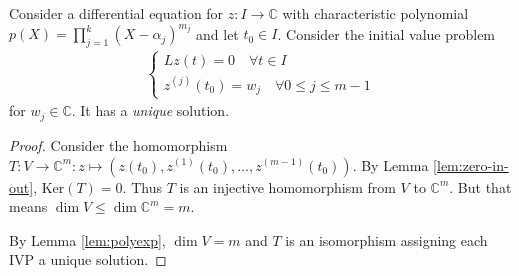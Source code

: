 \begin{prop}\label{prop:init-val-prob}
    Consider a differential equation for $z: I \to \mathbb{C}$ with characteristic polynomial $p(X) = \prod_{j=1}^{k}(X-\alpha_{j})^{m_{j}}$ and let $t_{0} \in I$. Consider the initial value problem 
    \begin{align*}
        \begin{cases}
            Lz(t) = 0 \quad \forall t \in I \\ 
            z^{(j)}(t_{0}) = w_{j} \quad \forall 0 \leq j \leq m-1
        \end{cases}
    \end{align*}
    for $w_{j} \in \mathbb{C}$. It has a \textit{unique} solution.
\end{prop}
\begin{proof}
    Consider the homomorphism $T: V \to \mathbb{C}^{m}: z \mapsto (z(t_{0}), z^{(1)}(t_{0}), \dots, z^{(m-1)}(t_{0}))$. By Lemma \ref{lem:zero-in-out}, $\text{Ker}(T) = 0$. Thus $T$ is an injective homomorphism from $V$ to $\mathbb{C}^{m}$. But that means $\dim V \leq \dim \mathbb{C}^{m} = m$.
    
    By Lemma \ref{lem:polyexp}, $\dim V = m$ and $T$ is an isomorphism assigning each IVP a unique solution.
\end{proof}

